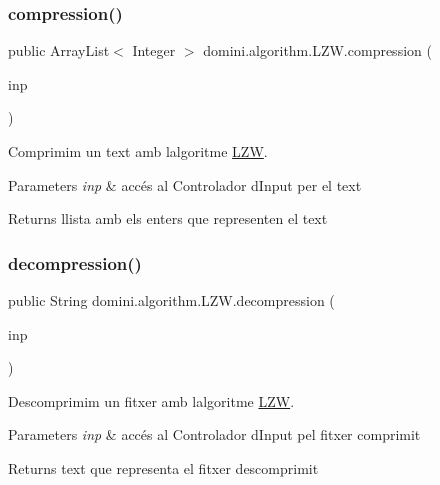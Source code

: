 \subsubsection{\texorpdfstring{compression()}{compression()}}
{\footnotesize\ttfamily public Array\+List$<$ Integer $>$ domini.\+algorithm.\+L\+Z\+W.\+compression (\begin{DoxyParamCaption}\item[{\hyperlink{classpersistencia_1_1input_1_1Ctrl__Input__Text}{Ctrl\+\_\+\+Input\+\_\+\+Text}}]{inp }\end{DoxyParamCaption})\hspace{0.3cm}{\ttfamily [inline]}}



Comprimim un text amb l\textquotesingle{}algoritme \hyperlink{classdomini_1_1algorithm_1_1LZW}{L\+ZW}. 


\begin{DoxyParams}{Parameters}
{\em inp} & accés al Controlador d\textquotesingle{}Input per el text \\
\hline
\end{DoxyParams}
\begin{DoxyReturn}{Returns}
llista amb els enters que representen el text 
\end{DoxyReturn}
\mbox{\label{classdomini_1_1algorithm_1_1LZW_a1c7f66a62ed475a72a49f294c41f54fa}} 
\subsubsection{\texorpdfstring{decompression()}{decompression()}}
{\footnotesize\ttfamily public String domini.\+algorithm.\+L\+Z\+W.\+decompression (\begin{DoxyParamCaption}\item[{\hyperlink{classpersistencia_1_1input_1_1Ctrl__Input__LZW}{Ctrl\+\_\+\+Input\+\_\+\+L\+ZW}}]{inp }\end{DoxyParamCaption})\hspace{0.3cm}{\ttfamily [inline]}}



Descomprimim un fitxer amb l\textquotesingle{}algoritme \hyperlink{classdomini_1_1algorithm_1_1LZW}{L\+ZW}. 


\begin{DoxyParams}{Parameters}
{\em inp} & accés al Controlador d\textquotesingle{}Input pel fitxer comprimit \\
\hline
\end{DoxyParams}
\begin{DoxyReturn}{Returns}
text que representa el fitxer descomprimit 
\end{DoxyReturn}
\mbox{\label{classdomini_1_1algorithm_1_1LZW_a57ba5129e7f26d4cc066195e3d6c9c8c}} 

